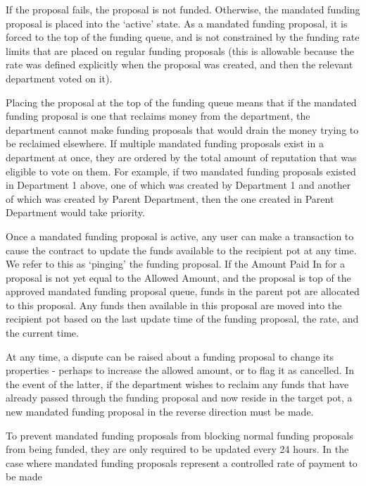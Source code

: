If the proposal fails, the proposal is not funded. Otherwise, the mandated funding proposal is placed into the ‘active’ state. As a mandated funding proposal, it is forced to the top of the funding queue, and is not constrained by the funding rate limits that are placed on regular funding proposals (this is allowable because the rate was defined explicitly when the proposal was created, and then the relevant department voted on it).

Placing the proposal at the top of the funding queue means that if the mandated funding proposal is one that reclaims money from the department, the department cannot make funding proposals that would drain the money trying to be reclaimed elsewhere. If multiple mandated funding proposals exist in a department at once, they are ordered by the total amount of reputation that was eligible to vote on them. For example, if two mandated funding proposals existed in Department 1 above, one of which was created by Department 1 and another of which was created by Parent Department, then the one created in Parent Department would take priority.

Once a mandated funding proposal is active, any user can make a transaction to cause the contract to update the funds available to the recipient pot at any time. We refer to this as ‘pinging’ the funding proposal. If the Amount Paid In for a proposal is not yet equal to the Allowed Amount, and the proposal is top of the approved mandated funding proposal queue, funds in the parent pot are allocated to this proposal. Any funds then available in this proposal are moved into the recipient pot based on the last update time of the funding proposal, the rate, and the current time.

At any time, a dispute can be raised about a funding proposal to change its properties - perhaps to increase the allowed amount, or to flag it as cancelled. In the event of the latter, if the department wishes to reclaim any funds that have already passed through the funding proposal and now reside in the target pot, a new mandated funding proposal in the reverse direction must be made.

To prevent mandated funding proposals from blocking normal funding proposals from being funded, they are only required to be updated every 24 hours. In the case where mandated funding proposals represent a controlled rate of payment to be made

